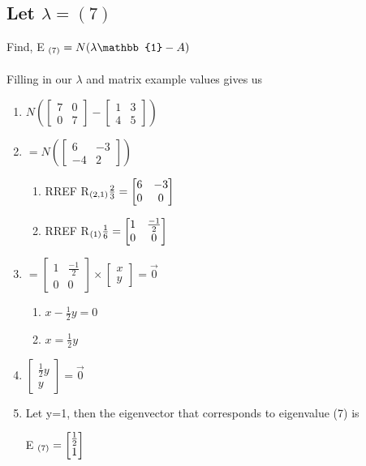\documentclass{article}
\begin{document}
\newpage
\subsection{Let $\lambda = (7)$}
Find, E $\textsubscript{(7)} = N( \lambda \mathbb{1} - A)$ 
\\
\\
Filling in our $\lambda$ and matrix example values gives us
\begin{center}
\begin{enumerate}
	\item $ N( \begin{bmatrix}    7 & 0 \\  0 & 7       \end{bmatrix} - \begin{bmatrix} 1  & 3    \\  4  & 5      \end{bmatrix} )$
	\item $ = N( \begin{bmatrix}    6 & -3 \\ -4 & 2       \end{bmatrix} )$
	\begin{enumerate}
		\item RREF R$\textsubscript{(2,1)}\frac{2}{3} = \begin{bmatrix}    6 & -3 \\  0 & 0       \end{bmatrix}$
		\item RREF R$\textsubscript{(1)}\frac{1}{6} = \begin{bmatrix}    1 & \frac{-1}{2} \\  0 & 0       \end{bmatrix}$
	\end{enumerate}
	\item $ = \begin{bmatrix}    1  &    \frac{-1}{2} \\     0  & 0       \end{bmatrix} 
		\times  \begin{bmatrix}   x  \\  y    \end{bmatrix} = \vec{0} $
	\begin{enumerate}
		\item $ x - \frac{ 1}{2} y = 0 $
		\item $ x = \frac{1}{2} y $
	\end{enumerate}
	\item $\begin{bmatrix}   \frac{1}{2}  y  \\  y    \end{bmatrix} = \vec{0} $
	\item Let y=1, then the eigenvector that corresponds to eigenvalue (7) is
	\\
	\begin{center}
	E $\textsubscript{(7)} = \begin{bmatrix}   \frac{1}{2} \\  1    \end{bmatrix}$
	\end{center}
\end{enumerate}
\end{center}
\end{document}
